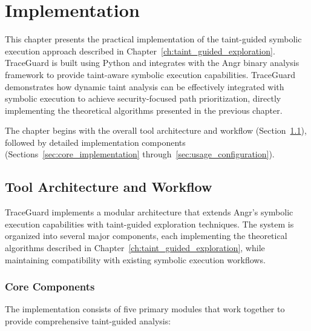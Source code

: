 \chapter{Implementation}
\label{ch:implementation}

This chapter presents the practical implementation of the taint-guided symbolic execution approach described in Chapter~\ref{ch:taint_guided_exploration}. TraceGuard is built using Python and integrates with the Angr binary analysis framework to provide taint-aware symbolic execution capabilities. TraceGuard demonstrates how dynamic taint analysis can be effectively integrated with symbolic execution to achieve security-focused path prioritization, directly implementing the theoretical algorithms presented in the previous chapter.

The chapter begins with the overall tool architecture and workflow (Section~\ref{sec:tool_architecture}), followed by detailed implementation components (Sections~\ref{sec:core_implementation} through~\ref{sec:usage_configuration}).

\section{Tool Architecture and Workflow}\label{sec:tool_architecture}

TraceGuard implements a modular architecture that extends Angr's symbolic execution capabilities with taint-guided exploration techniques. The system is organized into several major components, each implementing the theoretical algorithms described in Chapter~\ref{ch:taint_guided_exploration}, while maintaining compatibility with existing symbolic execution workflows.

\subsection{Core Components}

The implementation consists of five primary modules that work together to provide comprehensive taint-guided analysis:

